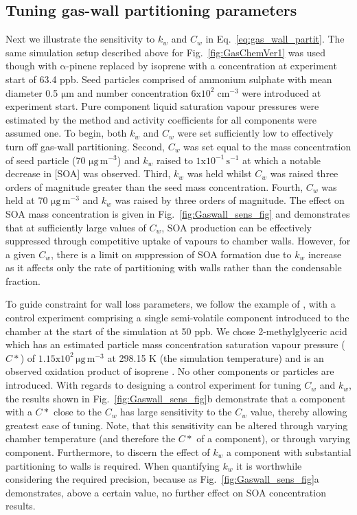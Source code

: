 \documentclass[gmd, manuscript]{copernicus}
\begin{document}
\subsection{Tuning gas-wall partitioning parameters}

Next we illustrate the sensitivity to $k_{w}$ and $C_{w}$ in Eq.~\ref{eq:gas_wall_partit}.  The same simulation setup described above for Fig.~\ref{fig:GasChemVer1} was used though with $\mathrm{\alpha}$-pinene replaced by isoprene with a concentration at experiment start of 63.4 ppb.  Seed particles comprised of ammonium sulphate with mean diameter 0.5 $\mathrm{\mu m}$ and number concentration $\mathrm{6x10^{2}\; cm^{-3}}$ were introduced at experiment start.  Pure component liquid saturation vapour pressures were estimated by the \citet{Nannoolal2008} method and activity coefficients for all components were assumed one.  To begin, both $k_{w}$ and $C_{w}$ were set sufficiently low to effectively turn off gas-wall partitioning.  Second, $C_{w}$ was set equal to the mass concentration of seed particle (70 $\mathrm{\mu g\,m^{-3}}$) and $k_{w}$ raised to $\mathrm{1x10^{-1}\, s^{-1}}$ at which a notable decrease in [SOA] was observed.  Third, $k_{w}$ was held whilst $C_{w}$ was raised three orders of magnitude greater than the seed mass concentration.  Fourth, $C_{w}$ was held at 70 $\mathrm{\mu g\,m^{-3}}$ and $k_{w}$ was raised by three orders of magnitude.  The effect on SOA mass concentration is given in Fig.~\ref{fig:Gaswall_sens_fig} and demonstrates that at sufficiently large values of $C_{w}$, SOA production can be effectively suppressed through competitive uptake of vapours to chamber walls.  However, for a given $C_{w}$, there is a limit on suppression of SOA formation due to $k_{w}$ increase as it affects only the rate of partitioning with walls rather than the condensable fraction.

To guide constraint for wall loss parameters, we follow the example of \citet{Matsunaga2010}, with a control experiment comprising a single semi-volatile component introduced to the chamber at the start of the simulation at 50 ppb.  We chose 2-methylglyceric acid which has an estimated particle mass concentration saturation vapour pressure ($C*$) of $\mathrm{1.15x10^2}\, \mathrm{\mu g\,m^{-3}}$ at 298.15 K (the simulation temperature) and is an observed oxidation product of isoprene \citep{Surratt2006}.  No other components or particles are introduced.  With regards to designing a control experiment for tuning $C_{w}$ and $k_{w}$, the results shown in Fig.~\ref{fig:Gaswall_sens_fig}b demonstrate that a component with a $C*$ close to the $C_{w}$ has large sensitivity to the $C_{w}$ value, thereby allowing greatest ease of tuning.  Note, that this sensitivity can be altered through varying chamber temperature (and therefore the $C*$ of a component), or through varying component.  Furthermore, to discern the effect of $k_{w}$ a component with substantial partitioning to walls is required.  When quantifying $k_{w}$ it is worthwhile considering the required precision, because as Fig.~\ref{fig:Gaswall_sens_fig}a demonstrates, above a certain value, no further effect on SOA concentration results.
\end{document}
